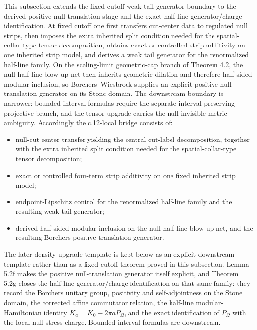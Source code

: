 This subsection extends the fixed-cutoff weak-tail-generator boundary to the derived positive null-translation stage and the exact half-line generator/charge identification. At fixed cutoff one first transfers cut-center data to regulated null strips, then imposes the extra inherited split condition needed for the spatial-collar-type tensor decomposition, obtains exact or controlled strip additivity on one inherited strip model, and derives a weak tail generator for the renormalized half-line family. On the scaling-limit geometric-cap branch of Theorem 4.2, the null half-line blow-up net then inherits geometric dilation and therefore half-sided modular inclusion, so Borchers--Wiesbrock supplies an explicit positive null-translation generator on its Stone domain. The downstream boundary is narrower: bounded-interval formulas require the separate interval-preserving projective branch, and the tensor upgrade carries the null-invisible metric ambiguity. Accordingly the c.12-local bridge consists of:
\begin{itemize}
\tightlist
\item
  null-cut center transfer yielding the central cut-label decomposition, together with the extra inherited split condition needed for the spatial-collar-type tensor decomposition;
\item
  exact or controlled four-term strip additivity on one fixed inherited strip model;
\item
  endpoint-Lipschitz control for the renormalized half-line family and the resulting weak tail generator;
\item
  derived half-sided modular inclusion on the null half-line blow-up net, and the resulting Borchers positive translation generator.
\end{itemize}
The later density-upgrade template is kept below as an explicit downstream template rather than as a fixed-cutoff theorem proved in this subsection. Lemma 5.2f makes the positive null-translation generator itself explicit, and Theorem 5.2g closes the half-line generator/charge identification on that same family: they record the Borchers unitary group, positivity and self-adjointness on the Stone domain, the corrected affine commutator relation, the half-line modular-Hamiltonian identity \(K_a=K_0-2\pi aP_\Omega\), and the exact identification of \(P_\Omega\) with the local null-stress charge. Bounded-interval formulas are downstream.

